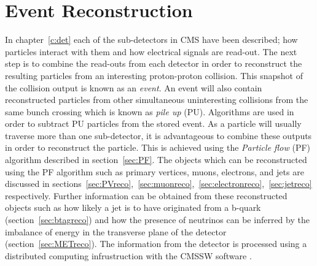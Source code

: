\chapter{Event Reconstruction}
\label{c:recon}


In chapter~\ref{c:det} each of the sub-detectors in CMS have been described; how particles interact with them and how electrical signals are read-out. The next step is to combine the read-outs from each detector in order to reconstruct the resulting particles from an interesting proton-proton collision. This snapshot of the collision output is known as an \emph{event}. An event will also contain reconstructed particles from other simultaneous uninteresting collisions from the same bunch crossing which is known as \emph{pile up} (PU). Algorithms are used in order to subtract PU particles from the stored event. 
As a particle will usually traverse more than one sub-detector, it is advantageous to combine these outputs in order to reconstruct the particle. This is achieved using the \emph{Particle flow} (PF) algorithm described in section~\ref{sec:PF}. The objects which can be reconstructed using the PF algorithm such as primary vertices, muons, electrons, and jets are discussed in sections~\ref{sec:PVreco},~\ref{sec:muonreco},~\ref{sec:electronreco},~\ref{sec:jetreco} respectively. Further information can be obtained from these reconstructed objects such as how likely a jet is to have originated from a b-quark (section~\ref{sec:btagreco}) and how the presence of neutrinos can be inferred by the imbalance of energy in the transverse plane of the detector (section~\ref{sec:METreco}).  
The information from the detector is processed using a distributed computing infrustruction with the CMSSW software .



